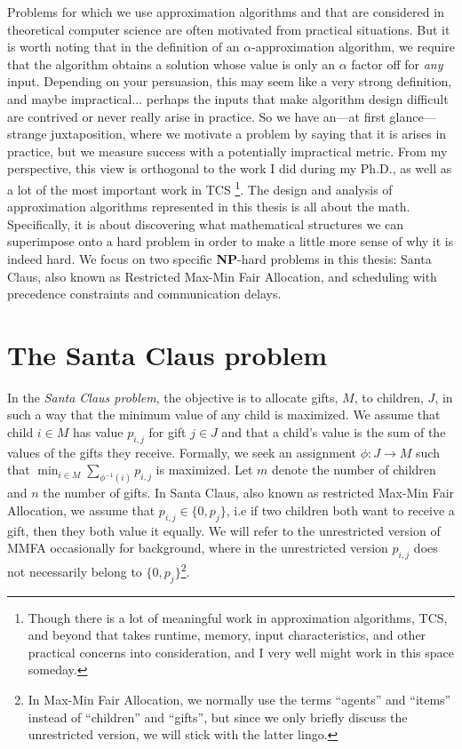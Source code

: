 Problems for which we use approximation algorithms and that are considered in theoretical computer science 
are often motivated from practical situations. 
But it is worth noting that in the definition of an $\alpha$-approximation algorithm, 
we require that the algorithm obtains a solution whose value is only an $\alpha$ factor off for \emph{any} input.
Depending on your persuasion, this may seem like a very strong definition, and maybe impractical... 
perhaps the inputs that make algorithm design difficult are contrived or never really arise in practice. 
So we have an---at first glance---strange juxtaposition, where we motivate a problem by saying that it is arises in practice,
but we measure success with a potentially impractical metric.
From my perspective, this view is orthogonal to the work I did during my Ph.D., as well as a lot of the most important work in TCS
\footnote{Though there is a lot of meaningful work in approximation algorithms, TCS, and beyond that 
takes runtime, memory, input characteristics, and other practical concerns into consideration, and I very well might work in this space someday.}.
The design and analysis of approximation algorithms represented in this thesis is all about the math.
Specifically, it is about discovering what mathematical structures we can superimpose onto a hard problem in order to make a little more sense 
of why it is indeed hard. 
We focus on two specific \textbf{NP}-hard problems in this thesis: Santa Claus, also known as Restricted Max-Min Fair Allocation, and scheduling 
with precedence constraints and communication delays.





\bigskip



\section{The Santa Claus problem}

In the \emph{Santa Claus problem}, the objective is to allocate gifts, $M$, to children, $J$, in such a way that the minimum value of any child is maximized. 
We assume that child $i \in M$ has value $p_{i,j}$ for gift $j \in J$ and that a child's value is the sum of the values of the gifts they receive. 
Formally, we seek an assignment $\phi: J \rightarrow M$ such that $\min_{i \in M} \sum_{\phi^{-1}(i)} p_{i,j}$ is maximized. 
Let $m$ denote the number of children and $n$ the number of gifts. 
In Santa Claus, also known as restricted Max-Min Fair Allocation, we assume that $p_{i,j} \in \{0,p_j\}$, i.e if two children both want to receive a gift, then they both value it equally.
We will refer to the unrestricted version of MMFA occasionally for background, 
where in the unrestricted version $p_{i,j}$ does not necessarily belong to $\{0,p_j\}$\footnote{In Max-Min Fair Allocation,
 we normally use the terms ``agents'' and ``items'' instead of ``children'' and ``gifts'', 
 but since we only briefly discuss the unrestricted version, we will stick with the latter lingo.}.

